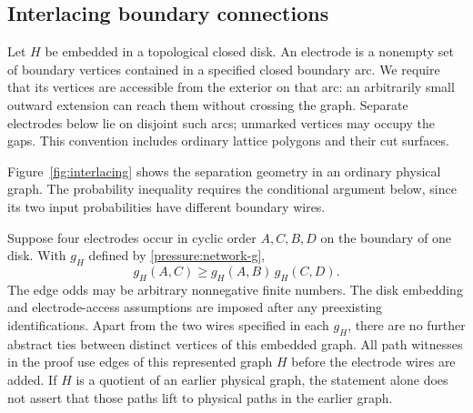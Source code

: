\subsection{Interlacing boundary connections}

Let $H$ be embedded in a topological closed disk. An electrode is a
nonempty set of boundary vertices contained in a specified closed
boundary arc. We require that its vertices are accessible from the
exterior on that arc: an arbitrarily small outward extension can
reach them without crossing the graph. Separate electrodes below
lie on disjoint such arcs; unmarked vertices may occupy the gaps.
This convention includes ordinary lattice polygons and their cut
surfaces.

Figure~\ref{fig:interlacing} shows the separation geometry in an
ordinary physical graph. The probability inequality requires the conditional argument below,
since its two input probabilities have different boundary wires.


\begin{lemma}
\label{lem:interlacing}
Suppose four electrodes occur in cyclic order $A,C,B,D$ on the
boundary of one disk. With $g_H$ defined by
\eqref{pressure:network-g},
\begin{equation}
 g_H(A,C)\ge g_H(A,B)\,g_H(C,D).
 \label{pressure:interlacing}
\end{equation}
The edge odds may be arbitrary nonnegative finite numbers. The disk
embedding and electrode-access assumptions are imposed after any
preexisting identifications. Apart from the two wires specified in
each $g_H$, there are no further abstract ties between distinct
vertices of this embedded graph.
All path witnesses in the proof use edges of this represented graph
$H$ before the electrode wires are added. If $H$ is a quotient of an
earlier physical graph, the statement alone does not assert that those
paths lift to physical paths in the earlier graph.
\end{lemma}

